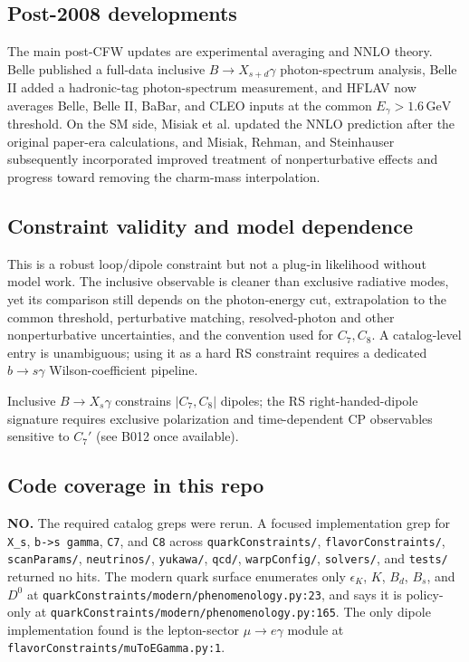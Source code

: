 \subsection*{Post-2008 developments}
The main post-CFW updates are experimental averaging and NNLO theory.  Belle
published a full-data inclusive \(B\to X_{s+d}\gamma\) photon-spectrum
analysis, Belle II added a hadronic-tag photon-spectrum measurement, and HFLAV
now averages Belle, Belle II, BaBar, and CLEO inputs at the common
\(E_\gamma>1.6\,\mathrm{GeV}\) threshold.  On the SM side, Misiak et al.
updated the NNLO prediction after the original paper-era calculations, and
Misiak, Rehman, and Steinhauser subsequently incorporated improved treatment
of nonperturbative effects and progress toward removing the charm-mass
interpolation.

\subsection*{Constraint validity and model dependence}
This is a robust loop/dipole constraint but not a plug-in likelihood without
model work.  The inclusive observable is cleaner than exclusive radiative
modes, yet its comparison still depends on the photon-energy cut,
extrapolation to the common threshold, perturbative matching, resolved-photon
and other nonperturbative uncertainties, and the convention used for
\(C_7,C_8\).  A catalog-level entry is unambiguous; using it as a hard RS
constraint requires a dedicated \(b\to s\gamma\) Wilson-coefficient pipeline.

Inclusive \(B\to X_s\gamma\) constrains \(|C_7,C_8|\) dipoles; the RS
right-handed-dipole signature requires exclusive polarization and
time-dependent CP observables sensitive to \(C_7'\) (see B012 once available).

\subsection*{Code coverage in this repo}
\textbf{NO.}  The required catalog greps were rerun.  A focused implementation grep for
\texttt{X\_s}, \texttt{b->s gamma}, \texttt{C7}, and \texttt{C8} across
\texttt{quarkConstraints/}, \texttt{flavorConstraints/}, \texttt{scanParams/},
\texttt{neutrinos/}, \texttt{yukawa/}, \texttt{qcd/}, \texttt{warpConfig/},
\texttt{solvers/}, and \texttt{tests/} returned no hits.  The modern quark
surface enumerates only \(\epsilon_K\), \(K\), \(B_d\), \(B_s\), and \(D^0\)
at \texttt{quarkConstraints/modern/phenomenology.py:23}, and says it is
policy-only at \texttt{quarkConstraints/modern/phenomenology.py:165}.  The
only dipole implementation found is the lepton-sector
\(\mu\to e\gamma\) module at \texttt{flavorConstraints/muToEGamma.py:1}.

